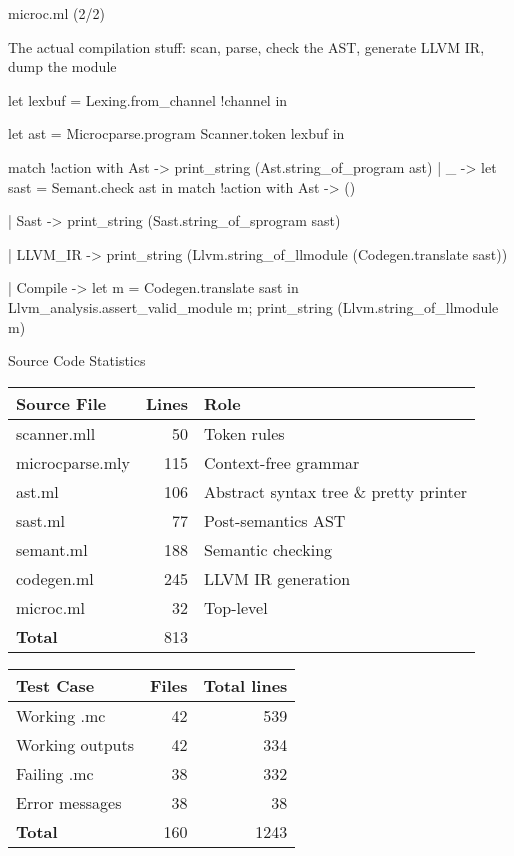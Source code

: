\documentclass{plt}
\begin{document}
\begin{frame}[fragile=singleslide]{microc.ml (2/2)}

  The actual compilation stuff: scan, parse, check the AST, generate
  LLVM IR, dump the module

\begin{ocaml}
  let lexbuf = Lexing.from_channel !channel in
  
  let ast = Microcparse.program Scanner.token lexbuf in
  
  match !action with
    Ast -> print_string (Ast.string_of_program ast)
  | _ -> let sast = Semant.check ast in
    match !action with
      Ast     -> ()

    | Sast    -> print_string (Sast.string_of_sprogram sast)

    | LLVM_IR -> print_string (Llvm.string_of_llmodule
                                  (Codegen.translate sast))

    | Compile -> let m = Codegen.translate sast in
	Llvm_analysis.assert_valid_module m;
	print_string (Llvm.string_of_llmodule m)
\end{ocaml}
\end{frame}

\begin{frame}{Source Code Statistics}
  
\small
  
\begin{tabular}{lrl}
\toprule
\textbf{Source File} & \textbf{Lines} & \textbf{Role} \\
\midrule
scanner.mll   &   50 & Token rules \\
microcparse.mly    &  115 & Context-free grammar \\
ast.ml        &  106 & Abstract syntax tree \& pretty printer \\
sast.ml       &   77 & Post-semantics AST \\
semant.ml     &  188 & Semantic checking \\
codegen.ml    &  245 & LLVM IR generation \\
microc.ml     &   32 & Top-level \\
\midrule
\textbf{Total} & 813 \\
\bottomrule
\end{tabular}

\begin{tabular}{lrr}
\toprule
\textbf{Test Case} & \textbf{Files} & \textbf{Total lines} \\
\midrule
Working .mc & 42 & 539 \\
Working outputs & 42 & 334 \\
Failing .mc & 38 & 332 \\
Error messages & 38 & 38 \\
\midrule
\textbf{Total} & 160 & 1243 \\
\bottomrule
\end{tabular}

\end{frame}
\end{document}

